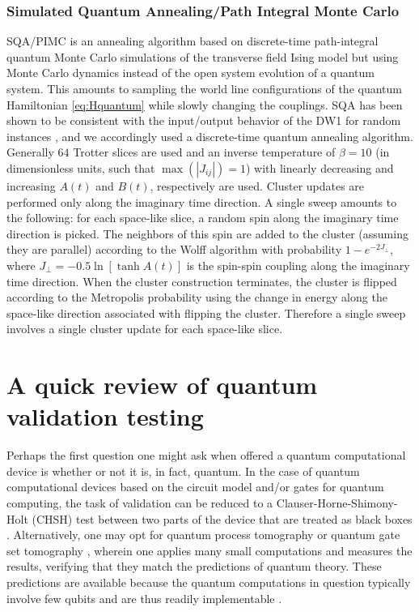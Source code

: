 \subsubsection{Simulated Quantum Annealing/Path Integral Monte Carlo}
SQA/PIMC \cite{sqa1,Heim:2014jf,Crosson:2016fk} is an annealing algorithm based on discrete-time path-integral quantum Monte Carlo simulations of the transverse field Ising model but using Monte Carlo dynamics instead of the open system evolution of a quantum system. This amounts to sampling the world line configurations of the quantum Hamiltonian \eqref{eq:Hquantum} while slowly changing the couplings. SQA has been shown to be consistent with the input/output behavior of the DW1 for random instances \cite{q108}, and we accordingly used a discrete-time quantum annealing algorithm.  Generally $64$ Trotter slices are used and an inverse temperature of $\beta=10$ (in dimensionless units, such that $\max(|J_{ij}|) = 1$) with linearly decreasing and increasing $A(t)$ and $B(t)$, respectively are used.  Cluster updates are performed only along the imaginary time direction.  A single sweep amounts to the following: for each space-like slice, a random spin along the imaginary time direction is picked.  The neighbors of this spin are added to the cluster (assuming they are parallel) according to the Wolff algorithm \cite{PhysRevLett.62.361} with probability $1 - e^{-2 J_{\perp}}$, where $J_\perp = -0.5 \ln \left[ \tanh A(t) \right]$ is the spin-spin coupling along the imaginary time direction.  When the cluster construction terminates, the cluster is flipped according to the Metropolis probability using the change in energy along the space-like direction associated with flipping the cluster.  Therefore a single sweep involves a single cluster update for each space-like slice.

\section{A quick review of quantum validation testing}
\label{sec:QVT}

Perhaps the first question one might ask when offered a quantum computational device is whether or not it is, in fact, quantum. In the case of quantum computational devices based on the circuit model and/or gates for quantum computing, the task of validation can be reduced to a Clauser-Horne-Shimony-Holt (CHSH) test between two parts of the device that are treated as black boxes \cite{Reichardt:2013db}. Alternatively, one may opt for quantum process tomography \cite{Chuang:97c,Mohseni:2008ly} or quantum gate set tomography \cite{blume2013robust,Greenbaum:2015aa}, wherein one applies many small computations and measures the results, verifying that they match the predictions of quantum theory. These predictions are available because the quantum computations in question typically involve few qubits and are thus readily implementable \cite{Childs:00,Blume-Kohout:2017aa}.

